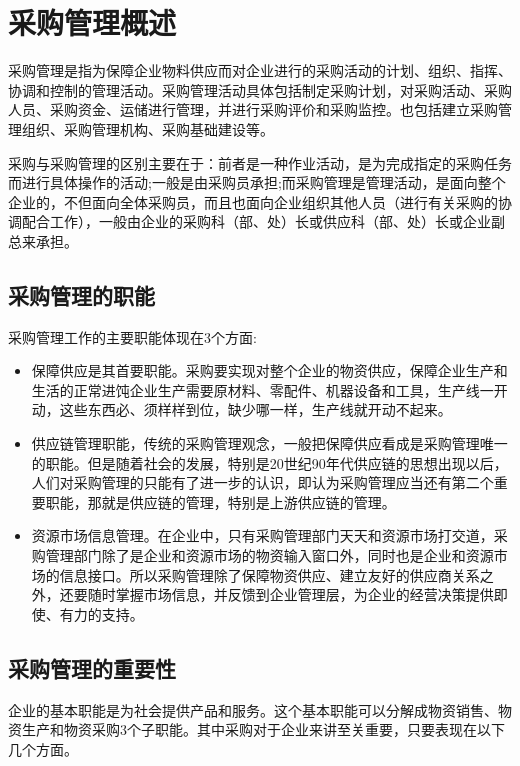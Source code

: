 \section {采购管理概述}

    采购管理是指为保障企业物料供应而对企业进行的采购活动的计划、组织、指挥、协调和控制的管理活动。采购管理活动具体包括制定采购计划，对采购活动、采购人员、采购资金、运储进行管理，并进行采购评价和采购监控。也包括建立采购管理组织、采购管理机构、采购基础建设等。

    采购与采购管理的区别主要在于：前者是一种作业活动，是为完成指定的采购任务而进行具体操作的活动;一般是由采购员承担;而采购管理是管理活动，是面向整个企业的，不但面向全体采购员，而且也面向企业组织其他人员（进行有关采购的协调配合工作），一般由企业的采购科（部、处）长或供应科（部、处）长或企业副总来承担。

\subsection {采购管理的职能}
    采购管理工作的主要职能体现在3个方面:

    \begin{itemize}
        \item 保障供应是其首要职能。采购要实现对整个企业的物资供应，保障企业生产和生活的正常进饨企业生产需要原材料、零配件、机器设备和工具，生产线一开动，这些东西必、须样样到位，缺少哪一样，生产线就开动不起来。

        \item 供应链管理职能，传统的采购管理观念，一般把保障供应看成是采购管理唯一的职能。但是随着社会的发展，特别是20世纪90年代供应链的思想出现以后，人们对采购管理的只能有了进一步的认识，即认为采购管理应当还有第二个重要职能，那就是供应链的管理，特别是上游供应链的管理。

        \item 资源市场信息管理。在企业中，只有采购管理部门天天和资源市场打交道，采购管理部门除了是企业和资源市场的物资输入窗口外，同时也是企业和资源市场的信息接口。所以采购管理除了保障物资供应、建立友好的供应商关系之外，还要随时掌握市场信息，并反馈到企业管理层，为企业的经营决策提供即使、有力的支持。
    \end{itemize}

\subsection {采购管理的重要性}

    企业的基本职能是为社会提供产品和服务。这个基本职能可以分解成物资销售、物资生产和物资采购3个子职能。其中采购对于企业来讲至关重要，只要表现在以下几个方面。

